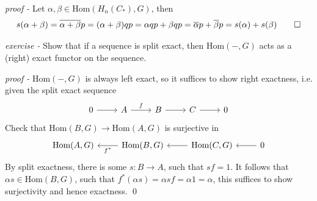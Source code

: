 \documentclass[11pt]{article}
\theoremstyle{definition}
\newcommand{\homo}{\text{Hom}}
\begin{document}
    \emph{proof - } Let \(\alpha, \beta \in \homo(H_n(C_*),G)\), then
    \[s(\alpha + \beta) = \overline{\alpha + \beta} p = (\alpha + \beta)qp = \alpha qp + \beta qp = \overline{\alpha}p + \overline{\beta} p = s(\alpha) + s(\beta) \qed\]


    \emph{exercise - }\label{CEx7} Show that if a sequence is split exact, then \(\homo(-,G)\) acts as a (right) exact functor on the sequence.

    \emph{proof - } \(\homo(-,G)\) is always left exact, so it suffices to show right exactness, i.e. given the split exact sequence
    \begin{equation*}
        \begin{tikzcd}
            0 \arrow[r,"{}"] & A \arrow[r,"{f}"] & B \arrow[r,"{}"] & C \arrow[r,"{}"] & 0
        \end{tikzcd}
    \end{equation*}
    Check that \(\homo(B,G) \to \homo(A,G)\) is surjective in
    \begin{equation*}
        \begin{tikzcd}
            \homo(A,G) & \homo(B,G) \arrow[l,"{f^*}"] & \homo(C,G) \arrow[l,"{}"] & 0 \arrow[l,"{}"]
        \end{tikzcd}
    \end{equation*}
    By split exactness, there is some \(s: B \to A\), such that \(sf = 1\). It follows that \(\alpha s \in \homo(B,G)\), such that
    \(f^*(\alpha s) = \alpha sf = \alpha 1 = \alpha\), this suffices to show surjectivity and hence exactness. \qed

\end{document}
